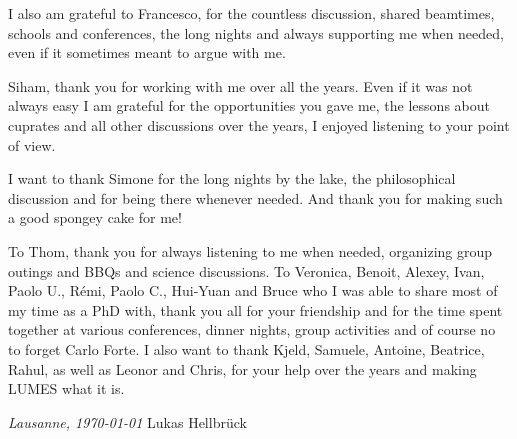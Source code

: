I also am grateful to Francesco, for the countless discussion, shared beamtimes, schools and conferences, the long nights and always supporting me when needed, even if it sometimes meant to argue with me.

Siham, thank you for working with me over all the years. Even if it was not always easy I am grateful for the opportunities you gave me, the lessons about cuprates and all other discussions over the years, I enjoyed listening to your point of view.

I want to thank Simone for the long nights by the lake, the philosophical discussion and for being there whenever needed. And thank you for making such a good spongey cake for me!

To Thom, thank you for always listening to me when needed, organizing group outings and BBQs and science discussions.
To Veronica, Benoit, Alexey, Ivan, Paolo U., Rémi, Paolo C., Hui-Yuan and Bruce who I was able to share most of my time as a PhD with, thank you all for your friendship and for the time spent together at various conferences, dinner nights, group activities and of course no to forget Carlo Forte.
I also want to thank Kjeld, Samuele, Antoine, Beatrice, Rahul, as well as Leonor and Chris, for your help over the years and making LUMES what it is.





\bigskip
 
\noindent\textit{Lausanne, \today}
\hfill Lukas Hellbrück

